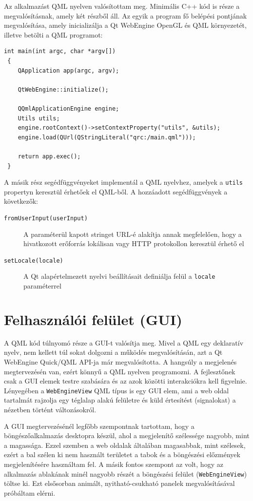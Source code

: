\documentclass[12pt]{report}
\begin{document}
Az alkalmazást QML nyelven valósítottam meg. Minimális C++ kód is része a megvalósításnak,
amely két részből áll. Az egyik a program fő belépési pontjának megvalósítása, amely
inicializálja a Qt WebEngine OpenGL és QML környezetét, illetve betölti a QML programot:
\begin{lstlisting}[title=main.cpp]
 int main(int argc, char *argv[])
 {
    QApplication app(argc, argv);

    QtWebEngine::initialize();

    QQmlApplicationEngine engine;
    Utils utils;
    engine.rootContext()->setContextProperty("utils", &utils);
    engine.load(QUrl(QStringLiteral("qrc:/main.qml")));

    return app.exec();
 }
\end{lstlisting}
A másik rész segédfüggvényeket implementál a QML nyelvhez, amelyek a \texttt{utils} propertyn
keresztül érhetőek el QML-ből. A hozzáadott segédfüggvények a következők:
\begin{description}
    \item[\texttt{fromUserInput(userInput)}] A paraméterül kapott stringet URL-é alakítja
        annak megfelelően, hogy a hivatkozott erőforrás lokálisan vagy HTTP protokollon
        keresztül érhető el
    \item[\texttt{setLocale(locale)}] A Qt alapértelmezett nyelvi beállításait definiálja
        felül a \texttt{locale} paraméterrel
\end{description}

\section{Felhasználói felület (GUI)}

A QML kód túlnyomó része a GUI-t valósítja meg. Mivel a QML egy deklaratív nyelv, nem kellett
túl sokat dolgozni a működés megvalósításán, azt a Qt WebEngine Quick/QML API-ja már
megvalósította. A hangsúly a megjelenés megtervezésén van, ezért könnyű a QML nyelven
programozni. A fejlesztőnek csak a GUI elemek testre szabására és az azok közötti
interakciókra kell figyelnie. Lényegében a \texttt{WebEngineView} QML típus is egy GUI elem,
ami a web oldal tartalmát rajzolja egy téglalap alakú felületre és küld értesítést
(signalokat) a nézetben történt változásokról.

A GUI megtervezésénél legfőbb szempontnak tartottam, hogy a böngészőalkalmazás desktopra
készül, ahol a megjelenítő szélessége nagyobb, mint a magassága. Ezzel szemben a web oldalak
általában magasabbak, mint szélesek, ezért a bal szélen ki nem használt területet a tabok
és a böngészési előzmények megjelenítésére használtam fel. A másik fontos szempont az volt,
hogy az alkalmazás ablakának minél nagyobb részét a böngészési felület
(\texttt{WebEngineView}) töltse ki. Ezt elsősorban animált, nyitható-csukható panelek
megvalósításával próbáltam elérni.
\end{document}
